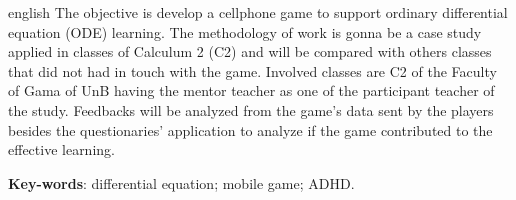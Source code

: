 \begin{resumo}[Abstract]
 \begin{otherlanguage*}{english}     
   The objective is develop a cellphone game to support ordinary differential equation (ODE) learning. The methodology of work is gonna be a case study applied in classes of Calculum 2 (C2) and will be compared with others classes that did not had in touch with the game. Involved classes are C2 of the Faculty of Gama of UnB having the mentor teacher as one of the participant teacher of the study. Feedbacks will be analyzed from the game's data sent by the players besides the questionaries' application to analyze if the game contributed to the effective learning.
   
   \begin{comment}
   metodologia 
   revisão bibliográfica 
   estudo de caso 
      software educacional 
   ensino equações diferenciais ordinárias
   auxílio de aprendizagem de EDO
   Faculdade do Gama
   diagnostico através da avaliação
   aplicação de questionário
   \end{comment}
   

   \vspace{\onelineskip}
 
   \noindent 
   \textbf{Key-words}: differential equation; mobile game; ADHD.
 \end{otherlanguage*}
\end{resumo}
